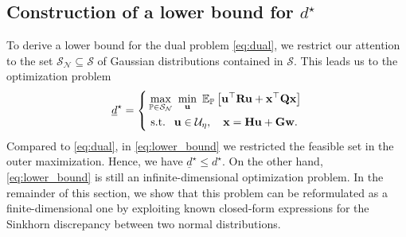 \documentclass[letterpaper, 10 pt, conference]{ieeeconf}  %
\theoremstyle{ieeeconf}
\begin{document}
\subsection{Construction of a lower bound for \texorpdfstring{$d^\star$}{d*}}
To derive a lower bound for the dual problem \eqref{eq:dual}, we restrict our attention to the set \( \mathcal{S}_{\mathcal{N}} \subseteq \mathcal{S} \) of Gaussian distributions contained in \( \mathcal{S} \). This leads us to the optimization problem
\begin{equation}
    \label{eq:lower_bound}
    \underline{d}^\star =
    \left\{
    \begin{aligned}
    &\max_{\mathbb{P} \in \mathcal{S_N}}\ \min_{\bf u}\ \mathbb{E}_{\mathbb{P}}\left[\bf u^{\top} R u + x^{\top} Q x \right]
    \\
    &\text { s.t. }\ \mathbf{u} \in \mathcal{U}_{\eta}, \quad \bf x = H u + G w.
    \end{aligned}
    \right.
\end{equation}
Compared to \eqref{eq:dual}, in \eqref{eq:lower_bound} we restricted the feasible set in the outer maximization. Hence, we have $\underline{d}^\star \leq d^\star$. On the other hand, \eqref{eq:lower_bound} is still an infinite-dimensional optimization problem. In the remainder of this section, we show that this problem can be reformulated as a finite-dimensional one by exploiting known closed-form expressions for the Sinkhorn discrepancy between two normal distributions.
\end{document}
